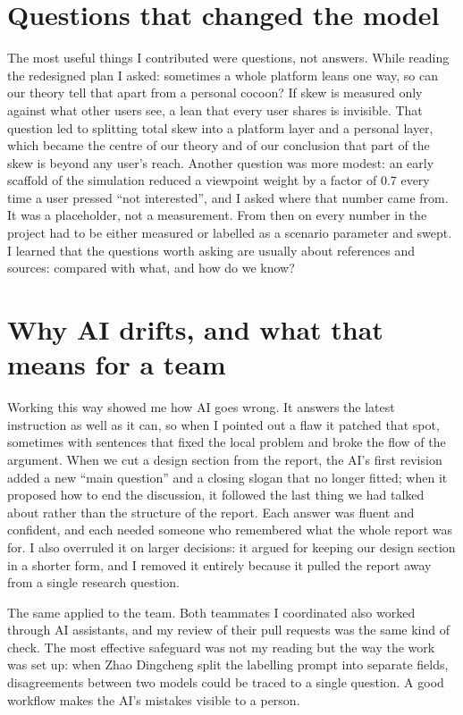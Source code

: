 \documentclass[11pt,a4paper]{article}
\begin{document}
\section{Questions that changed the model}

The most useful things I contributed were questions, not answers. While reading the redesigned plan I asked: sometimes a whole platform leans one way, so can our theory tell that apart from a personal cocoon? If skew is measured only against what other users see, a lean that every user shares is invisible. That question led to splitting total skew into a platform layer and a personal layer, which became the centre of our theory and of our conclusion that part of the skew is beyond any user's reach. Another question was more modest: an early scaffold of the simulation reduced a viewpoint weight by a factor of 0.7 every time a user pressed ``not interested'', and I asked where that number came from. It was a placeholder, not a measurement. From then on every number in the project had to be either measured or labelled as a scenario parameter and swept. I learned that the questions worth asking are usually about references and sources: compared with what, and how do we know?

\section{Why AI drifts, and what that means for a team}

Working this way showed me how AI goes wrong. It answers the latest instruction as well as it can, so when I pointed out a flaw it patched that spot, sometimes with sentences that fixed the local problem and broke the flow of the argument. When we cut a design section from the report, the AI's first revision added a new ``main question'' and a closing slogan that no longer fitted; when it proposed how to end the discussion, it followed the last thing we had talked about rather than the structure of the report. Each answer was fluent and confident, and each needed someone who remembered what the whole report was for. I also overruled it on larger decisions: it argued for keeping our design section in a shorter form, and I removed it entirely because it pulled the report away from a single research question.

The same applied to the team. Both teammates I coordinated also worked through AI assistants, and my review of their pull requests was the same kind of check. The most effective safeguard was not my reading but the way the work was set up: when Zhao Dingcheng split the labelling prompt into separate fields, disagreements between two models could be traced to a single question. A good workflow makes the AI's mistakes visible to a person.
\end{document}
